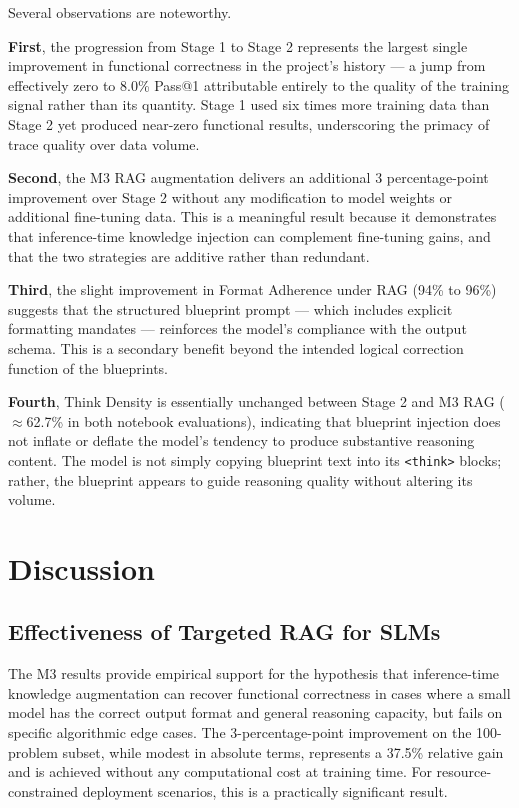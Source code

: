 \documentclass[12pt,a4paper]{article}
\begin{document}
Several observations are noteworthy.

\textbf{First}, the progression from Stage 1 to Stage 2 represents the largest single improvement in functional correctness in the project's history --- a jump from effectively zero to 8.0\% Pass@1 attributable entirely to the quality of the training signal rather than its quantity. Stage 1 used six times more training data than Stage 2 yet produced near-zero functional results, underscoring the primacy of trace quality over data volume.

\textbf{Second}, the M3 RAG augmentation delivers an additional 3 percentage-point improvement over Stage 2 without any modification to model weights or additional fine-tuning data. This is a meaningful result because it demonstrates that inference-time knowledge injection can complement fine-tuning gains, and that the two strategies are additive rather than redundant.

\textbf{Third}, the slight improvement in Format Adherence under RAG (94\% to 96\%) suggests that the structured blueprint prompt --- which includes explicit formatting mandates --- reinforces the model's compliance with the output schema. This is a secondary benefit beyond the intended logical correction function of the blueprints.

\textbf{Fourth}, Think Density is essentially unchanged between Stage 2 and M3 RAG ($\approx$62.7\% in both notebook evaluations), indicating that blueprint injection does not inflate or deflate the model's tendency to produce substantive reasoning content. The model is not simply copying blueprint text into its \texttt{<think>} blocks; rather, the blueprint appears to guide reasoning quality without altering its volume.

\section{Discussion}
\label{sec:discussion}

\subsection{Effectiveness of Targeted RAG for SLMs}

The M3 results provide empirical support for the hypothesis that inference-time knowledge augmentation can recover functional correctness in cases where a small model has the correct output format and general reasoning capacity, but fails on specific algorithmic edge cases. The 3-percentage-point improvement on the 100-problem subset, while modest in absolute terms, represents a 37.5\% relative gain and is achieved without any computational cost at training time. For resource-constrained deployment scenarios, this is a practically significant result.
\end{document}
